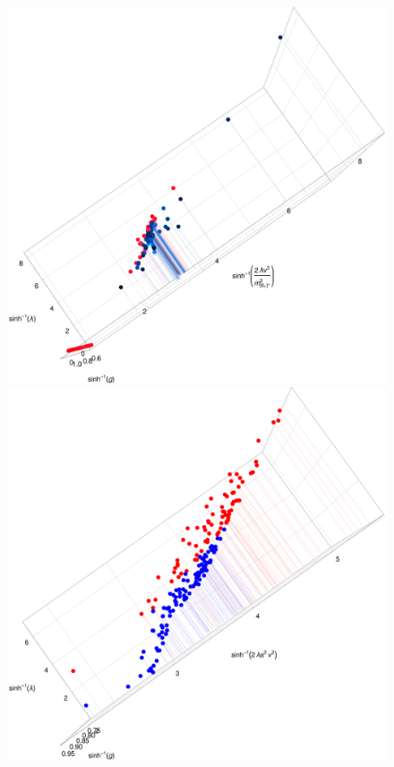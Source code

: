 \documentclass[final,twoside,12pt]{article}
\newcommand*{\1}{1\!\!\!\bot}
\begin{document}
\begin{figure}[!htbp]
\vspace{-0.5cm}
\begin{minipage}{0.7\linewidth}
\includegraphics[width=\linewidth]{lcp-su2-cont}\\
\includegraphics[width=\linewidth]{lcp-su3-cont}

\end{minipage}
\end{figure}
\end{document}
